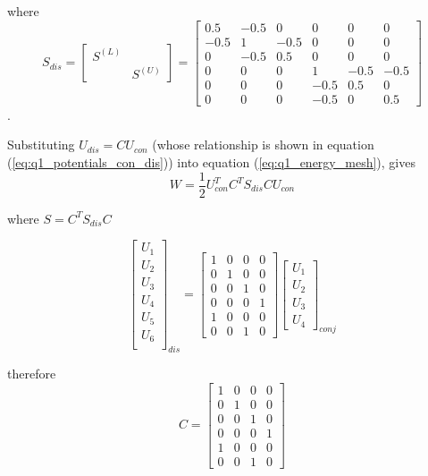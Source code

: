 \documentclass[11pt]{amsart}
\begin{document}
where $$ S_{dis} = \begin{bmatrix} S^{(L)} & \\ & S^{(U)}\end{bmatrix} =
\begin{bmatrix}
            0.5 & -0.5 & 0 & 0 & 0 & 0\\
            -0.5 & 1 & -0.5 & 0 & 0 & 0\\
            0 & -0.5 & 0.5 & 0 & 0 & 0\\
            0 & 0 & 0 & 1 & -0.5 & -0.5\\
            0 & 0 & 0 & -0.5 & 0.5 & 0\\
            0 & 0 & 0 & -0.5 & 0 & 0.5
\end{bmatrix}
$$.

Substituting $U_{dis} = C U_{con}$ (whose relationship is shown in equation (\ref{eq:q1_potentials_con_dis})) into equation (\ref{eq:q1_energy_mesh}), gives $$W = \frac{1}{2} U^{T}_{con} C^{T} S_{dis} C U_{con}$$

where $S = C^{T} S_{dis} C$

\begin{equation}
	\label{eq:q1_potentials_con_dis}
        \begin{bmatrix}
            U_1\\
            U_2\\
            U_3\\
            U_4\\
            U_5\\
            U_6\\
        \end{bmatrix}_{dis}
        =
        \begin{bmatrix}
	1 & 0 & 0 & 0\\
	0 & 1 & 0 & 0\\
	0 & 0 & 1 & 0\\
	0 & 0 & 0 & 1\\
	1 & 0 & 0 & 0\\
	0 & 0 & 1 & 0
        \end{bmatrix}
        \begin{bmatrix}
            U_1\\
            U_2\\
            U_3\\
            U_4
        \end{bmatrix}_{conj}
\end{equation}

therefore 
$$C =         \begin{bmatrix}
                    	1 & 0 & 0 & 0\\
                    	0 & 1 & 0 & 0\\
                    	0 & 0 & 1 & 0\\
                    	0 & 0 & 0 & 1\\
                    	1 & 0 & 0 & 0\\
                    	0 & 0 & 1 & 0
                \end{bmatrix}
$$
\end{document}
